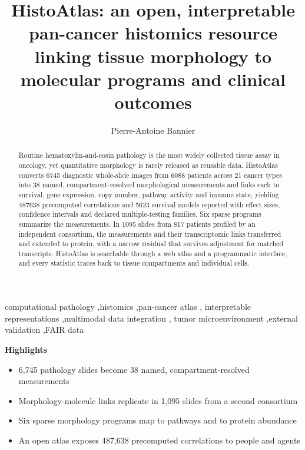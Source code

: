 \documentclass[preprint,review,12pt]{elsarticle}
\newenvironment{hlbox}
  {\par\noindent\textbf{\large Highlights}\par\vspace{0.4em}
   \begin{itemize}\setlength{\itemsep}{0.2em}}
  {\end{itemize}\par\vspace{0.6em}}
\begin{document}
\begin{frontmatter}

\title{HistoAtlas: an open, interpretable pan-cancer histomics resource
linking tissue morphology to molecular programs and clinical outcomes}

\author[1]{Pierre-Antoine Bannier}
\address[1]{Independent researcher}

\begin{abstract}
Routine hematoxylin-and-eosin pathology is the most widely collected tissue
assay in oncology, yet quantitative morphology is rarely released as reusable
data. HistoAtlas converts \num{6745} diagnostic whole-slide images from
\num{6088} patients across 21 cancer types into 38 named, compartment-resolved
morphological measurements and links each to survival, gene expression, copy
number, pathway activity and immune state, yielding \num{487638} precomputed
correlations and \num{5623} survival models reported with effect sizes,
confidence intervals and declared multiple-testing families. Six sparse
programs summarize the measurements. In \num{1095} slides from 817 patients
profiled by an independent consortium, the measurements and their
transcriptomic links transferred and extended to protein, with a narrow residual
that survives adjustment for matched transcripts. HistoAtlas is searchable
through a web atlas and a programmatic interface, and every statistic traces
back to tissue compartments and individual cells.
\end{abstract}

\begin{keyword}
computational pathology \sep histomics \sep pan-cancer atlas \sep
interpretable representations \sep multimodal data integration \sep
tumor microenvironment \sep external validation \sep FAIR data
\end{keyword}

\end{frontmatter}

\begin{hlbox}
\item 6,745 pathology slides become 38 named, compartment-resolved measurements
\item Morphology-molecule links replicate in 1,095 slides from a second consortium
\item Six sparse morphology programs map to pathways and to protein abundance
\item An open atlas exposes 487,638 precomputed correlations to people and agents
\end{hlbox}
\end{document}
